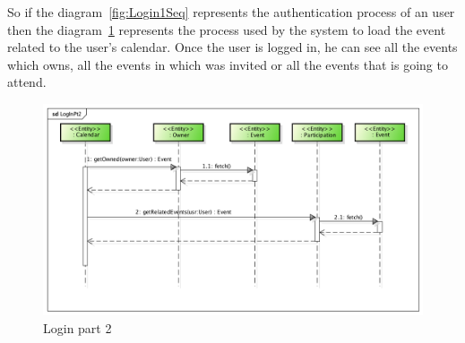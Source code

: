     \begin{center}
So if the diagram~\ref{fig:Login1Seq} represents the authentication process of an user then the diagram~\ref{fig:Login2Seq} represents the process used by the system to load the event related to the user's calendar. Once the user is logged in, he can see all the events which owns, all the events in which was invited or all the events that is going to attend. 
 \begin{figure}[H]
    \includegraphics[width=1\textwidth]{../BCEDiagram/BCE/EntityOverview/LoginPt2.png}
    \caption{Login part 2}
     \label{fig:Login2Seq}
     \end{figure}
   \end{center} 
